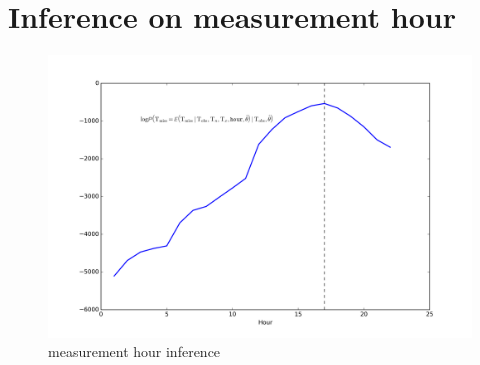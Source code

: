 \documentclass[letter]{article}
\makeatletter
\def\maxwidth{\ifdim\Gin@nat@width>\linewidth\linewidth
\else\Gin@nat@width\fi}
\let\Oldincludegraphics\includegraphics
\renewcommand{\includegraphics}[1]{\Oldincludegraphics[width=.8\maxwidth]{#1}}
\makeatother
\begin{document}
    	\section{Inference on measurement
hour}\label{inference-on-measurement-hour}

\begin{figure}
\centering
\includegraphics{figures/hr_inference.png}
\caption{measurement hour inference}
\end{figure}
    



    
    



    
    
\end{document}
